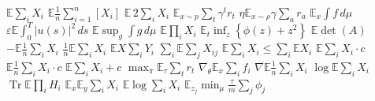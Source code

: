 \documentclass{article}
\begin{document}
$\mathbb{E}\sum_{i}X_{i}$ $\mathbb{E}\frac{1}{n}\sum_{i=1}^{n}[X_{i}]$ $\mathbb{E}\,2\sum_{i}X_{i}$ $\mathbb{E}_{x\sim p}\sum_{t}\gamma^{t}r_{t}$
$\eta\mathbb{E}_{x\sim\rho}\gamma\sum_{a}r_{a}$ $\mathbb{E}_{x}\int f\,d\mu$ $\varepsilon\mathbb{E}\int_{0}^{T}|u(s)|^{2}\,ds$
$\mathbb{E}\sup_{g}\int g\,d\mu$ $\mathbb{E}\prod_{i}X_{i}$ $\mathbb{E}_{t}\inf_{z}\left\{\phi(z)+z^{2}\right\}$ $\mathbb{E}\det(A)$
$-\mathbb{E}\frac{1}{n}\sum_{i}X_{i}$ $\frac{1}{n}\mathbb{E}\sum_{i}X_{i}$ $\mathbb{E}X\sum_{i}Y_{i}$ $\sum_{i}\mathbb{E}\sum_{j}X_{ij}$
$\mathbb{E}\sum_{i}X_{i}\leq\sum_{i}\mathbb{E}X_{i}$ $\mathbb{E}\sum_{i}X_{i}\cdot c$ $\mathbb{E}\frac{1}{n}\sum_{i}X_{i}\cdot c$ $\mathbb{E}\sum_{i}X_{i}+c$
$\max_{\pi}\mathbb{E}_{\tau}\sum_{t}r_{t}$ $\nabla_{\theta}\mathbb{E}_{x}\sum_{i}f_{i}$ $\nabla\mathbb{E}\frac{1}{n}\sum_{i}X_{i}$ $\log\mathbb{E}\sum_{i}X_{i}$ $\operatorname{Tr}\mathbb{E}\prod_{i}H_{i}$ $\mathbb{E}_{x}\mathbb{E}_{y}\sum_{i}X_{i}$
$\mathbb{E}\log\sum_{i}X_{i}$ $\mathbb{E}_{z_{j}}\min_{\mu}\frac{\tau}{m}\sum_{j}\phi_{j}$
\end{document}
